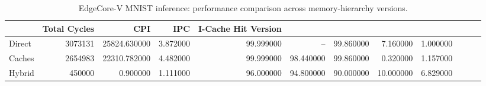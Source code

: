 \begin{table}
\caption{EdgeCore-V MNIST inference: performance comparison across memory-hierarchy versions.}
\label{tab:edgecorev_comparison}
\begin{tabular}{lrrrrrrrr}
\toprule
 & Total Cycles & CPI & IPC & I-Cache Hit %
Version &  &  &  &  &  &  &  &  \\
\midrule
Direct & 3073131 & 25824.630000 & 3.872000 & 99.999000 & -- & 99.860000 & 7.160000 & 1.000000 \\
Caches & 2654983 & 22310.782000 & 4.482000 & 99.999000 & 98.440000 & 99.860000 & 0.320000 & 1.157000 \\
Hybrid & 450000 & 0.900000 & 1.111000 & 96.000000 & 94.800000 & 90.000000 & 10.000000 & 6.829000 \\
\bottomrule
\end{tabular}
\end{table}
